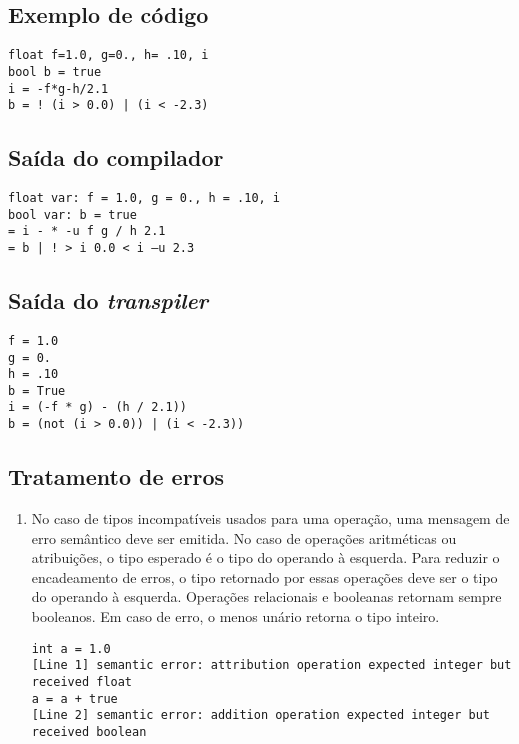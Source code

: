 \documentclass{sftex/sftex}
\newenvironment{smallenum}{
    \vspace{-1mm}
    \begin{enumerate}[label=\roman*.]
    \setlength{\parskip}{0pt}
    \setlength{\itemsep}{2pt}
}{
    \vspace{-2mm}
    \end{enumerate}
}
\begin{document}
\subsection{Exemplo de código}

\begin{verbatim}
float f=1.0, g=0., h= .10, i
bool b = true
i = -f*g-h/2.1
b = ! (i > 0.0) | (i < -2.3)
\end{verbatim}

\subsection{Saída do compilador}

\begin{verbatim}
float var: f = 1.0, g = 0., h = .10, i
bool var: b = true
= i - * -u f g / h 2.1
= b | ! > i 0.0 < i –u 2.3
\end{verbatim}

\subsection{Saída do \emph{transpiler}}

\begin{verbatim}
f = 1.0
g = 0.
h = .10
b = True
i = (-f * g) - (h / 2.1))
b = (not (i > 0.0)) | (i < -2.3))
\end{verbatim}

\subsection{Tratamento de erros}

\begin{smallenum}

\item No caso de tipos incompatíveis usados para uma operação, uma
    mensagem de erro semântico deve ser emitida. No caso de operações
    aritméticas ou atribuições, o tipo esperado é o tipo do operando à
    esquerda. Para reduzir o encadeamento de erros, o tipo retornado por
    essas operações deve ser o tipo do operando à esquerda. Operações
    relacionais e booleanas retornam sempre booleanos. Em caso de erro, o
    menos unário retorna o tipo inteiro.

\begin{verbatim}
int a = 1.0
[Line 1] semantic error: attribution operation expected integer but received float
a = a + true
[Line 2] semantic error: addition operation expected integer but received boolean
\end{verbatim}

\end{smallenum}
\end{document}

